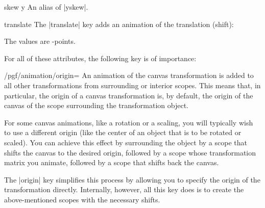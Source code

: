 \begin{animateattribute}{skew y}
  An alias of |yskew|.
\end{animateattribute}


\begin{animateattribute}{translate}
  The |translate| key adds an animation of the translation (shift):
\begin{codeexample}[animation list={0.5,1,1.5,2}]
\end{codeexample}
  The values are \pgfname-points.
\end{animateattribute}

For all of these attributes, the following key is of importance:
\begin{key}{/pgf/animation/origin=}
  An animation of the canvas transformation is added to all other
  transformations from surrounding or interior scopes. This means
  that, in particular, the origin of a canvas transformation is, by
  default, the origin of the canvas of the scope surrounding the
  transformation object.

  For some canvas animations, like a rotation or a scaling, you will
  typically wish to use a different origin (like the center of an
  object that is to be rotated or scaled). You can achieve this effect
  by surrounding the object by a scope that shifts the canvas to the
  desired origin, followed by a scope whose transformation matrix you
  animate, followed by a scope that shifts back the canvas.

  The |origin| key simplifies this process by allowing you to specify
  the origin of the transformation directly. Internally, however, all
  this key does is to create the above-mentioned scopes with the
  necessary shifts.
  
\begin{codeexample}[animation list={0.5,1,1.5,2}]
\end{codeexample}
\end{key}


